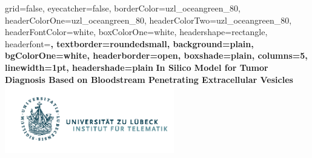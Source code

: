 \documentclass[a0paper,portrait]{baposter}
\begin{document}



\background{
}

\begin{poster}{
	grid=false,
	eyecatcher=false, 
	borderColor=uzl_oceangreen_80,
	headerColorOne=uzl_oceangreen_80,
	headerColorTwo=uzl_oceangreen_80,
	headerFontColor=white,
	boxColorOne=white,
	headershape=rectangle,
	headerfont=\large\bf,
	textborder=roundedsmall,
	background=plain,
	bgColorOne=white,
	headerborder=open,
	boxshade=plain,
	columns=5,
	linewidth=1pt,
	headershade=plain
}
{
}
{
	\vspace{0.3cm}
  \textcolor{uzl_oceangreen_80}{\textbf{In Silico Model for Tumor Diagnosis Based on Bloodstream Penetrating Extracellular Vesicles}}
    \vspace{0.3cm}
}
{
}
{
  \hspace{1cm}
  \includegraphics[height=8em]{Logo_Inst_Telematik_orig}
}


\end{poster}
\end{document}
